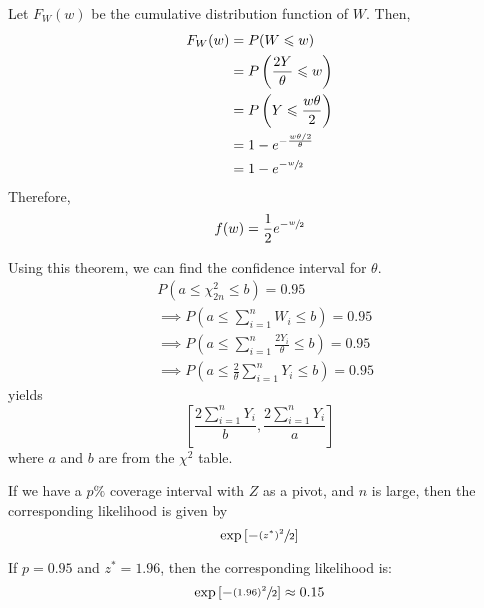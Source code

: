 \begin{Proof}{}{}
    Let $ F_W(w) $ be the cumulative distribution function of $ W $. Then,
    \begin{align*}
        F_W(w)
         & =P(W\leqslant w)                               \\
         & =P\left( \frac{2Y}{\theta} \leqslant w \right) \\
         & =P\left( Y\leqslant \frac{w\theta}{2} \right)  \\
         & =1-e^{-\frac{w\theta/2}{\theta}}               \\
         & =1-e^{-\sfrac{w}{2}}
    \end{align*}
    Therefore,
    \[ f(w)=\frac{1}{2} e^{-\sfrac{w}{2}} \]
\end{Proof}
Using this theorem, we can find the confidence interval for $ \theta $.
\begin{align*}
     & P\left(a\leqslant \chi^2_{2n}\leqslant b\right)=0.95                                         \\
     & \implies P\left(a \leqslant \sum\limits_{i=1}^{n} W_i \leqslant b\right)=0.95                \\
     & \implies P\left(a\leqslant \sum\limits_{i=1}^{n} \frac{2Y_i}{\theta} \leqslant b\right)=0.95 \\
     & \implies P\left(a\leqslant \frac{2}{\theta} \sum\limits_{i=1}^{n} Y_i\leqslant b\right)=0.95
\end{align*}
yields
\[ \left[ \frac{2 \sum\limits_{i=1}^{n} Y_i}{b} , \frac{2 \sum\limits_{i=1}^{n} Y_i}{a} \right] \]
where $ a $ and $ b $ are from the $ \chi^2 $ table.


\begin{Theorem}{}{}
    If we have a $ p\% $ coverage interval with $ Z $ as a pivot, and $ n $ is large, then
    the corresponding likelihood is given by
    \[ \exp\left[-\sfrac{(z^*)^2}{2}\right] \]
\end{Theorem}



\begin{Example}{}{}
    If $ p=0.95 $ and $ z^*=1.96 $, then the corresponding likelihood is:
    \[ \exp\left[-\sfrac{(1.96)^2}{2}\right] \approx 0.15 \]
\end{Example}

